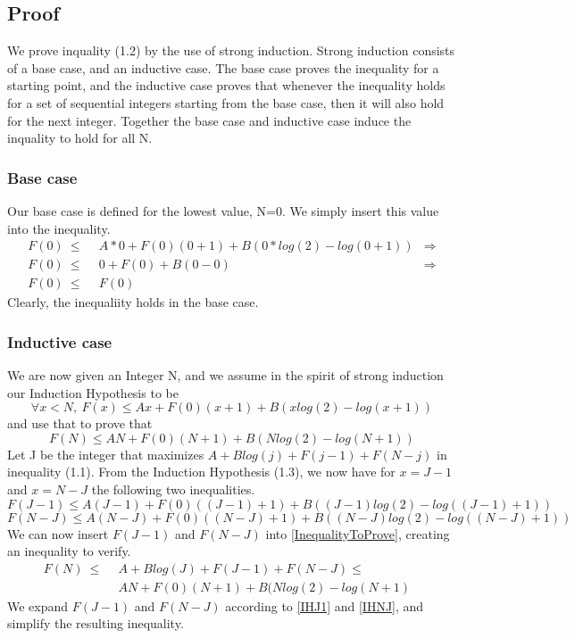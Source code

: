 \subsection{Proof}
We prove inquality (1.2) by the use of strong induction. Strong induction consists of a base case, and an inductive case. The base case proves the inequality for a starting point, and the inductive case proves that whenever the inequality holds for a set of sequential integers starting from the base case, then it will also hold for the next integer. Together the base case and inductive case induce the inquality to hold for all N. 
\subsubsection{Base case}
Our base case is defined for the lowest value, N=0. We simply insert this value into the inequality.
\begin{align*}
F(0)\ \le&\ \  A*0 + F(0)(0+1) + B(0*log(2)-log(0+1)) & \Rightarrow \\
F(0)\ \le&\ \  0 + F(0) + B(0-0) & \Rightarrow \\
F(0)\ \le&\ \  F(0) &
\end{align*}
Clearly, the inequaliity holds in the base case.

\subsubsection{Inductive case}
We are now given an Integer N, and we assume in the spirit of strong induction our Induction Hypothesis to be
\begin{equation}
\forall x < N,\ F(x) \le Ax + F(0)(x+1) + B(xlog(2)-log(x+1))
\label{IH}	
\end{equation}
and use that to prove that 
\begin{equation}
F(N) \le AN + F(0)(N+1) + B(Nlog(2)-log(N+1))
\label{InequalityToProve} 	
\end{equation}
Let J be the integer that maximizes $A + Blog(j) + F(j-1) + F(N-j)$ in inequality (1.1). From the Induction Hypothesis (1.3), we now have for $x=J-1$ and $x=N-J$ the following two inequalities.
\begin{equation}
F(J-1) \le A(J-1) + F(0)((J-1)+1) + B((J-1)log(2)-log((J-1)+1))
\label{IHJ1} 	
\end{equation}
\begin{equation}
F(N-J) \le A(N-J) + F(0)((N-J)+1) + B((N-J)log(2)-log((N-J)+1))
\label{IHNJ} 	
\end{equation}
We can now insert $F(J-1)$ and $F(N-J)$ into \ref{InequalityToProve}, creating an inequality to verify.
\begin{align*}
F(N)\ \le&\ \  A + Blog(J) + F(J-1) + F(N-J) \le   & \\
&\ \  AN + F(0)(N+1) + B(Nlog(2)-log(N+1) & 
\end{align*}
We expand $F(J-1)$ and $F(N-J)$ according to \ref{IHJ1} and \ref{IHNJ}, and simplify the resulting inequality.

